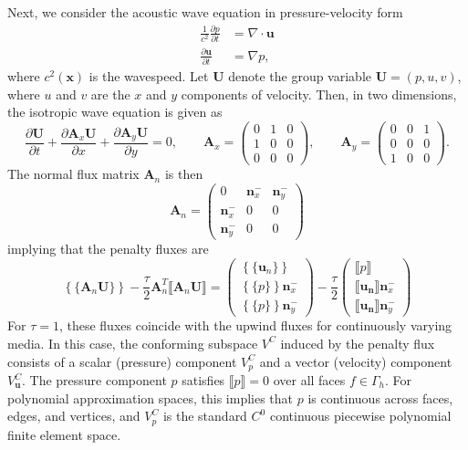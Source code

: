 \documentclass[10pt]{article}
\newcommand{\pd}[2]{\frac{\partial#1}{\partial#2}}
\newcommand{\LRc}[1]{\left\{ #1 \right\}}
\newcommand{\Grad} {\ensuremath{\nabla}}
\newcommand{\Div} {\ensuremath{\nabla\cdot}}
\newcommand{\jump}[1] {\ensuremath{\llbracket#1\rrbracket}}
\newcommand{\avg}[1] {\ensuremath{\LRc{\!\{#1\}\!}}}
\newcommand{\Gh}{\Gamma_h}
\begin{document}
Next, we consider the acoustic wave equation in pressure-velocity form
\begin{align*}
\frac{1}{c^2}\pd{p}{t} &= \Div \bm{u}\\
\pd{\bm{u}}{t} &= \Grad p,
\end{align*}
where $c^2(\bm{x})$ is the wavespeed.  Let $\bm{U}$ denote the group variable $\bm{U} = (p,u,v)$, where $u$ and $v$ are the $x$ and $y$ components of velocity.  Then, in two dimensions, the isotropic wave equation is given as
\[
\pd{\bm{U}}{t} + \pd{\bm{A}_x\bm{U}}{x} + \pd{\bm{A}_y\bm{U}}{y} = 0, \qquad \bm{A}_x = 
\left(\begin{array}{ccc}
0 & 1 & 0\\
1 & 0 & 0\\
0 & 0 & 0
\end{array}
\right), \qquad 
\bm{A}_y = 
\left(\begin{array}{ccc}
0 & 0 & 1\\
0 & 0 & 0\\
1 & 0 & 0
\end{array}
\right).
\]
The normal flux matrix $\bm{A}_n$ is then
\[
\bm{A}_n = 
\left(\begin{array}{ccc}
0 & \bm{n}^-_x & \bm{n}^-_y\\
\bm{n}^-_x & 0 & 0\\
\bm{n}^-_y & 0 & 0
\end{array}
\right)
\]
implying that the penalty fluxes are 
\[
\avg{\bm{A}_n \bm{U}} - \frac{\tau}{2}\bm{A}_n^T \jump{\bm{A}_n\bm{U}} = \left(\begin{array}{c}
\avg{\bm{u}_n}\\
\avg{p }\bm{n}^-_x\\
\avg{p }\bm{n}^-_y
\end{array}
\right) - 
\frac{\tau}{2}\left(\begin{array}{c}
\jump{p}\\
\jump{\bm{u_n}}\bm{n}^-_x\\
\jump{\bm{u_n}}\bm{n}^-_y
\end{array}
\right)
\]
For $\tau = 1$, these fluxes coincide with the upwind fluxes for continuously varying media.  In this case, the conforming subspace $V^{C}$ induced by the penalty flux consists of a scalar (pressure) component $V^C_p$ and a vector (velocity) component $V^C_{\bm{u}}$.  The pressure component $p$ satisfies $\jump{p} = 0$ over all faces $f\in \Gh$.  For polynomial approximation spaces, this implies that $p$ is continuous across faces, edges, and vertices, and $V^C_p$ is the standard $C^0$ continuous piecewise polynomial finite element space.  
\end{document}
